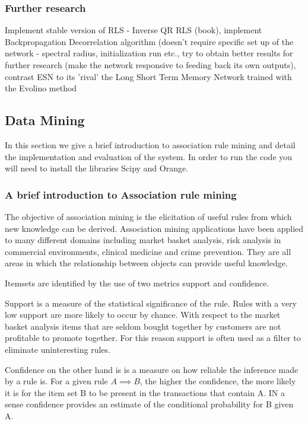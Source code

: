 \subsubsection*{Further research}
Implement stable version of RLS - Inverse QR RLS (book), implement Backpropagation Decorrelation algorithm (doesn't require specific set up of the network - spectral radius, initialization run etc., try to obtain better results for further research (make the network responsive to feeding back its own outputs), contrast ESN to its 'rival' the Long Short Term Memory Network trained with the Evolino method 

\subsection*{Data Mining}

In this section we give a brief introduction to association rule mining and detail the implementation and evaluation of the system. In order to run the code you will need to install the libraries Scipy and Orange.

\subsubsection{A brief introduction to Association rule mining}

The objective of association  mining is the elicitation of useful rules from which new knowledge can be derived. Association mining applications have been applied to many different domains including market basket analysis, risk analysis in commercial environments, clinical medicine and crime prevention. They are all areas in which the relationship between objects can provide useful knowledge. 

Itemsets are identified by the use of two metrics support and confidence. 

Support is a measure of the statistical significance of the rule. Rules with a very low support are more likely to occur by chance. With respect to the market basket analysis items that are seldom bought together by customers are not profitable to promote together. For this reason support is often used as a filter to eliminate uninteresting rules. 

Confidence on the other hand is is a measure on how reliable the inference made by a rule is. For a given rule $A \implies B$, the higher the confidence, the more likely it is for the item set B to be present in the transactions that contain A. IN a sense confidence provides an estimate of the conditional probability for B given A. 

